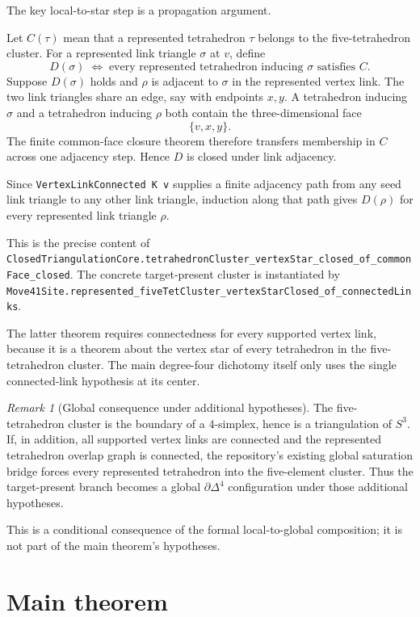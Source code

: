 \documentclass[11pt]{article}
\theoremstyle{definition}
\theoremstyle{remark}
\newtheorem{remark}[theorem]{Remark}
\begin{document}
The key local-to-star step is a propagation argument.

Let $C(\tau)$ mean that a represented tetrahedron $\tau$ belongs to the
five-tetrahedron cluster.  For a represented link triangle $\sigma$ at
$v$, define
\[
  D(\sigma)
  \;\Longleftrightarrow\;
  \text{every represented tetrahedron inducing }\sigma\text{ satisfies }C.
\]
Suppose $D(\sigma)$ holds and $\rho$ is adjacent to $\sigma$ in the
represented vertex link.  The two link triangles share an edge, say with
endpoints $x,y$.  A tetrahedron inducing $\sigma$ and a tetrahedron
inducing $\rho$ both contain the three-dimensional face
\[
  \{v,x,y\}.
\]
The finite common-face closure theorem therefore transfers membership in
$C$ across one adjacency step.  Hence $D$ is closed under link adjacency.

Since \texttt{\small VertexLinkConnected K v} supplies a finite adjacency path
from any seed link triangle to any other link triangle, induction along that
path gives $D(\rho)$ for every represented link triangle $\rho$.

This is the precise content of
\texttt{\small ClosedTriangulationCore.tetrahedronCluster\_vertexStar\_closed\_of\_commonFace\_closed}.
The concrete target-present cluster is instantiated by
\texttt{\small Move41Site.represented\_fiveTetCluster\_vertexStarClosed\_of\_connectedLinks}.

The latter theorem requires connectedness for every supported vertex link,
because it is a theorem about the vertex star of every tetrahedron in the
five-tetrahedron cluster.  The main degree-four dichotomy itself only uses
the single connected-link hypothesis at its center.

\begin{remark}[Global consequence under additional hypotheses]
The five-tetrahedron cluster is the boundary of a $4$-simplex, hence is a
triangulation of $S^3$.  If, in addition, all supported vertex links are
connected and the represented tetrahedron overlap graph is connected, the
repository's existing global saturation bridge forces every represented
tetrahedron into the five-element cluster.  Thus the target-present branch
becomes a global $\partial\Delta^4$ configuration under those additional
hypotheses.

This is a conditional consequence of the formal local-to-global
composition; it is not part of the main theorem's hypotheses.
\end{remark}

\section{Main theorem}
\end{document}
